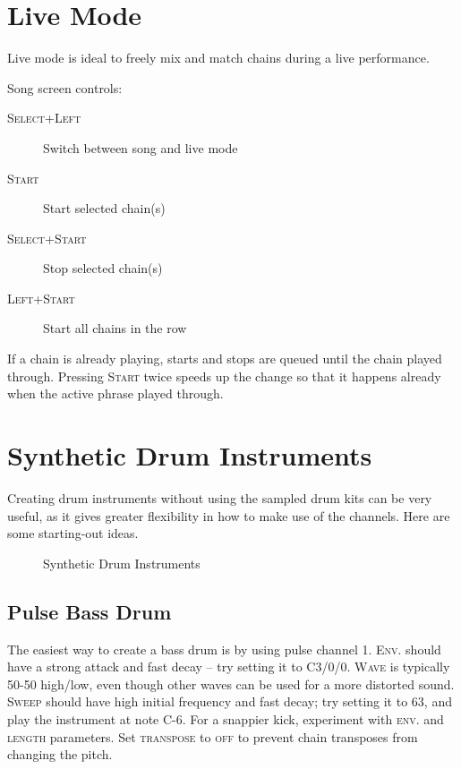 \section{Live Mode}

Live mode is ideal to freely mix and match chains during a live performance.

Song screen controls:

\begin{description}
	\item[\textsc{Select+Left}] Switch between song and live mode
	\item[\textsc{Start}] Start selected chain(s)
	\item[\textsc{Select+Start}] Stop selected chain(s)
	\item[\textsc{Left+Start}] Start all chains in the row
\end{description}

If a chain is already playing, starts and stops are queued until the chain played through.
Pressing \textsc{Start} twice speeds up the change so that it happens already when the active phrase played through.

\section{Synthetic Drum Instruments}

Creating drum instruments without using the sampled drum kits can be very useful, as it gives greater flexibility in how to make use of the channels. Here are some starting-out ideas.

\begin{figure}[hbtp]
	\centering
	\qquad

	\qquad


	\caption{Synthetic Drum Instruments}
	\label{fig:instr-examples}
\end{figure}

\subsection{Pulse Bass Drum}

The easiest way to create a bass drum is by using pulse channel 1. \textsc{Env.} should have a strong attack and fast decay -- try setting it to C3/0/0. \textsc{Wave} is typically 50-50 high/low, even though other waves can be used for a more distorted sound. \textsc{Sweep} should have high initial frequency and fast decay; try setting it to 63, and play the instrument at note C-6. For a snappier kick, experiment with \textsc{env.} and \textsc{length} parameters. Set \textsc{transpose} to \textsc{off} to prevent chain transposes from changing the pitch.


